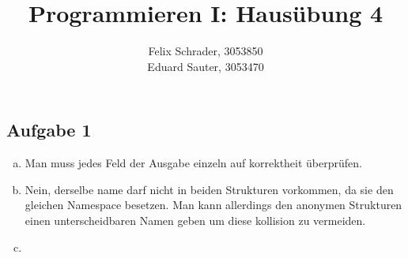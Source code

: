 \documentclass[11pt]{article}
\author{Felix Schrader, 3053850 \\
      Eduard Sauter, 3053470 }
\title{Programmieren I: Haus\"ubung 4}
\begin{document}
\maketitle
\subsection*{Aufgabe 1}
\begin{enumerate}[a)]
  \item Man muss jedes Feld der Ausgabe einzeln auf korrektheit \"uberpr\"ufen.

  \item Nein, derselbe name darf nicht in beiden Strukturen vorkommen, 
    da sie den gleichen Namespace besetzen. Man kann allerdings den
    anonymen Strukturen einen unterscheidbaren Namen geben um diese kollision
    zu vermeiden.

  \item 
\end{enumerate} 
\end{document}
